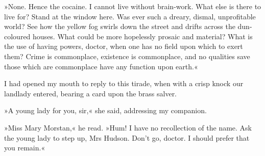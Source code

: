 »None. Hence the cocaine. I cannot live without brain-work. What else is there to live for? Stand at the window here. Was ever such a dreary, dismal, unprofitable world? See how the yellow fog swirls down the street and drifts across the dun-coloured houses. What could be more hopelessly prosaic and material? What is the use of having powers, doctor, when one has no field upon which to exert them? Crime is commonplace, existence is commonplace, and no qualities save those which are commonplace have any function upon earth.«

I had opened my mouth to reply to this tirade, when with a crisp knock our landlady entered, bearing a card upon the brass salver.

»A young lady for you, sir,« she said, addressing my companion.

»Miss Mary Morstan,« he read. »Hum! I have no recollection of the name. Ask the young lady to step up, Mrs Hudson. Don't go, doctor. I should prefer that you remain.«